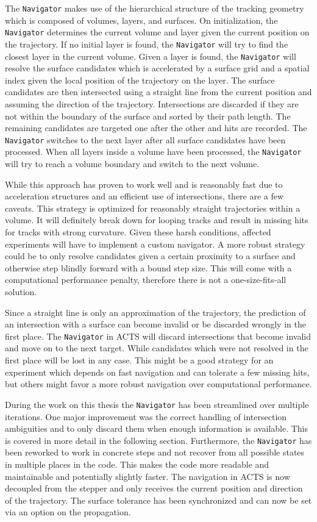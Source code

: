 The \texttt{Navigator} makes use of the hierarchical structure of the tracking geometry which is composed of volumes, layers, and surfaces. On initialization, the \texttt{Navigator} determines the current volume and layer given the current position on the trajectory. If no initial layer is found, the \texttt{Navigator} will try to find the closest layer in the current volume. Given a layer is found, the \texttt{Navigator} will resolve the surface candidates which is accelerated by a surface grid and a spatial index given the local position of the trajectory on the layer. The surface candidates are then intersected using a straight line from the current position and assuming the direction of the trajectory. Intersections are discarded if they are not within the boundary of the surface and sorted by their path length. The remaining candidates are targeted one after the other and hits are recorded. The \texttt{Navigator} switches to the next layer after all surface candidates have been processed. When all layers inside a volume have been processed, the \texttt{Navigator} will try to reach a volume boundary and switch to the next volume.

While this approach has proven to work well and is reasonably fast due to acceleration structures and an efficient use of intersections, there are a few caveats. This strategy is optimized for reasonably straight trajectories within a volume. It will definitely break down for looping tracks and result in missing hits for tracks with strong curvature. Given these harsh conditions, affected experiments will have to implement a custom navigator. A more robust strategy could be to only resolve candidates given a certain proximity to a surface and otherwise step blindly forward with a bound step size. This will come with a computational performance penalty, therefore there is not a one-size-fits-all solution.

Since a straight line is only an approximation of the trajectory, the prediction of an intersection with a surface can become invalid or be discarded wrongly in the first place. The \texttt{Navigator} in ACTS will discard intersections that become invalid and move on to the next target. While candidates which were not resolved in the first place will be lost in any case. This might be a good strategy for an experiment which depends on fast navigation and can tolerate a few missing hits, but others might favor a more robust navigation over computational performance.

During the work on this thesis the \texttt{Navigator} has been streamlined over multiple iterations. One major improvement was the correct handling of intersection ambiguities and to only discard them when enough information is available. This is covered in more detail in the following section. Furthermore, the \texttt{Navigator} has been reworked to work in concrete steps and not recover from all possible states in multiple places in the code. This makes the code more readable and maintainable and potentially slightly faster. The navigation in ACTS is now decoupled from the stepper and only receives the current position and direction of the trajectory. The surface tolerance has been synchronized and can now be set via an option on the propagation.

